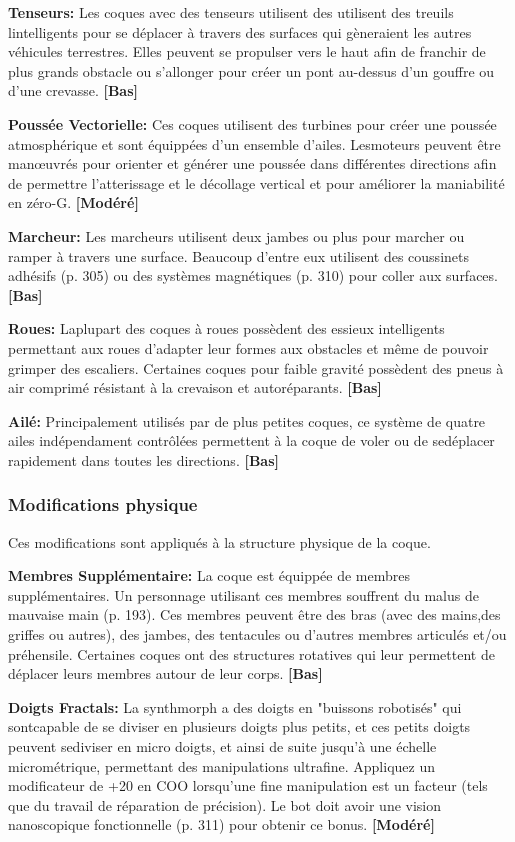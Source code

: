 \textbf{Tenseurs:} Les coques avec des tenseurs utilisent des utilisent des treuils lintelligents pour se déplacer à travers des surfaces qui gèneraient les autres véhicules terrestres. Elles peuvent se propulser vers le haut afin de franchir de plus grands obstacle ou s'allonger pour créer un pont au-dessus d'un gouffre ou d'une crevasse. \textbf{[Bas]} 

\textbf{Poussée Vectorielle:} Ces coques utilisent des turbines pour créer une poussée atmosphérique et sont équippées d'un ensemble d'ailes. Lesmoteurs peuvent être manœuvrés pour orienter et générer une poussée dans différentes directions afin de permettre l'atterissage et le décollage vertical et pour améliorer la maniabilité en zéro-G. \textbf{[Modéré]} 

\textbf{Marcheur:} Les marcheurs utilisent deux jambes ou plus pour marcher ou ramper à travers une surface. Beaucoup d'entre eux utilisent des coussinets adhésifs (p. 305) ou des systèmes magnétiques (p. 310) pour coller aux surfaces. \textbf{[Bas]} 

\textbf{Roues:} Laplupart des coques à roues possèdent des essieux intelligents permettant aux roues d'adapter leur formes aux obstacles et même de pouvoir grimper des escaliers. Certaines coques pour faible gravité possèdent des pneus à air comprimé résistant à la crevaison et autoréparants. \textbf{[Bas]} 

\textbf{Ailé:} Principalement utilisés par de plus petites coques, ce système de quatre ailes indépendament contrôlées permettent à la coque de voler ou de sedéplacer rapidement dans toutes les directions. \textbf{[Bas]} 

\subsubsection{Modifications physique} 

Ces modifications sont appliqués à la structure physique de la coque. 

\textbf{Membres Supplémentaire:} La coque est équippée de membres supplémentaires. Un personnage utilisant ces membres souffrent du malus de mauvaise main (p. 193). Ces membres peuvent être des bras (avec des mains,des griffes ou autres), des jambes, des tentacules ou d'autres membres articulés et/ou préhensile. Certaines coques ont des structures rotatives qui leur permettent de déplacer leurs membres autour de leur corps. \textbf{[Bas]} 

\textbf{Doigts Fractals:} La synthmorph a des doigts en "buissons robotisés" qui sontcapable de se diviser en plusieurs doigts plus petits, et ces petits doigts peuvent sediviser en micro doigts, et ainsi de suite jusqu'à une échelle micrométrique, permettant des manipulations ultrafine. Appliquez un modificateur de +20 en COO lorsqu'une fine manipulation est un facteur (tels que du travail de réparation de précision). Le bot doit avoir une vision nanoscopique fonctionnelle (p. 311) pour obtenir ce bonus. \textbf{[Modéré]} 

